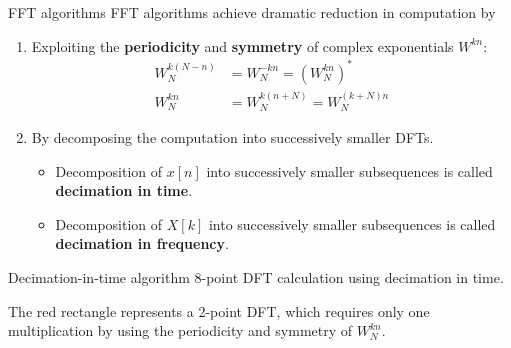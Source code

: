 \documentclass[10pt, handout]{beamer}
\begin{document}
% 
\begin{frame}{FFT algorithms}
	FFT algorithms achieve dramatic reduction in computation by
	\begin{enumerate}
		\item Exploiting the \textbf{periodicity} and \textbf{symmetry} of complex exponentials $W^{kn}$:
		\begin{align*}
		W_N^{k(N-n)} &= W_N^{-kn} = (W_N^{kn})^* \tag{complex conjugate symmetry} \\
		W_N^{kn} &= W_N^{k(n+N)} = W_N^{(k+N)n}  \tag{periodicity in $n$ and $k$}
		\end{align*}
		\item By decomposing the computation into successively smaller DFTs. 
		\begin{itemize}
			\item Decomposition of $x[n]$ into successively smaller subsequences is called \textbf{decimation in time}.
			\item Decomposition of $X[k]$ into successively smaller subsequences is called \textbf{decimation in frequency}.
		\end{itemize}
	\end{enumerate}
\end{frame}

% 
\begin{frame}{Decimation-in-time algorithm}
8-point DFT calculation using decimation in time.

The red rectangle represents a 2-point DFT, which requires only one multiplication by using the periodicity and symmetry of $W_N^{kn}$.
\begin{center}
\end{center}

\end{frame}
\end{document}
